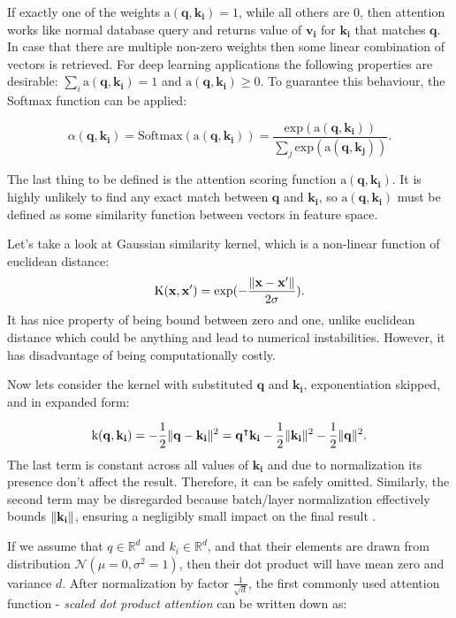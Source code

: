 If exactly one of the weights $\text{a}(\mathbf{q},\mathbf{k_i}) = 1$, while all others are $0$, then attention works like normal database query and returns value of $\mathbf{v_i}$ for $\mathbf{k_i}$ that matches $\mathbf{q}$.
In case that there are multiple non-zero weights then some linear combination of vectors is retrieved. 
For deep learning applications the following properties are desirable: $\sum_i \text{a}(\mathbf{q}, \mathbf{k_i}) = 1$ and $\text{a}(\mathbf{q}, \mathbf{k_i}) \ge 0$. To guarantee this behaviour, the Softmax function can be applied:

\[ \alpha(\mathbf{q}, \mathbf{k_i}) = \text{Softmax}(\text{a}(\mathbf{q}, \mathbf{k_i})) = \frac{\text{exp}(\text{a}(\mathbf{q}, \mathbf{k_i}))}{\sum_j \text{exp}(\text{a}(\mathbf{q}, \mathbf{k_j}))}.\]

The last thing to be defined is the attention scoring function $\text{a}(\mathbf{q}, \mathbf{k_i})$.
It is highly unlikely to find any exact match between $\mathbf{q}$ and $\mathbf{k_i}$, so $\text{a}(\mathbf{q}, \mathbf{k_i})$ must be defined as some similarity function between vectors in feature space.

Let's take a look at Gaussian similarity kernel, which is a non-linear function of euclidean distance:
\[\text{K}(\mathbf{x}, \mathbf{x'}) = \text{exp}(-\frac{\Vert\mathbf{x} - \mathbf{x'}\Vert}{2\sigma}).\]
It has nice property of being bound between zero and one, unlike euclidean distance which could be anything and lead to numerical instabilities.
However, it has disadvantage of being computationally costly.

Now lets consider the kernel with substituted $\mathbf{q}$ and $\mathbf{k_i}$, exponentiation skipped, and in expanded form:

\[\text{k}(\mathbf{q}, \mathbf{k_i}) = -\frac{1}{2}\Vert\mathbf{q} - \mathbf{k_i}\Vert^2 = \mathbf{q}^\intercal \mathbf{k_i} - \frac{1}{2}\Vert\mathbf{k_i}\Vert^2 - \frac{1}{2}\Vert\mathbf{q}\Vert^2.\]
The last term is constant across all values of $\mathbf{k_i}$ and due to normalization its presence don't affect the result. 
Therefore, it can be safely omitted. 
Similarly, the second term may be disregarded because batch/layer normalization effectively bounds $\Vert\mathbf{k_i}\Vert$, ensuring a negligibly small impact on the final result \cite{d2lAttentionScoring}.

If we assume that $q \in \mathbb{R}^{d}$ and $k_i \in \mathbb{R}^d$, and that their elements are drawn from distribution $\mathcal{N}(\mu=0, \sigma^2=1)$, then their dot product will have mean zero and variance $d$.
After normalization by factor $\frac{1}{\sqrt{d}}$, the first commonly used attention function - \emph{scaled dot product attention} \cite{Vaswani2017} can be written down as:

